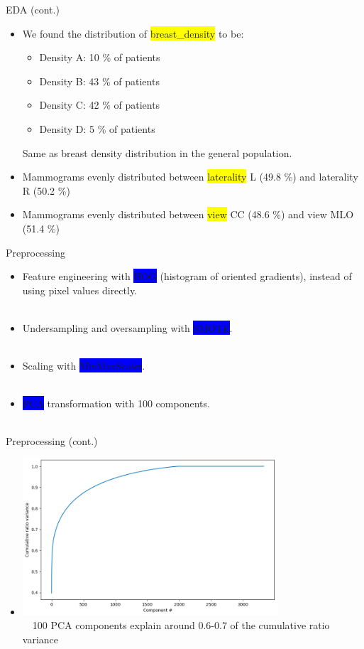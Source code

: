 \documentclass[14pt]{beamer}
\begin{document}
\begin{frame}{\small EDA (cont.)}
\begin{itemize}
    \item We found the distribution of \colorbox{yellow}{breast\_density} to be:
    \begin{itemize}
        \item Density A: 10 \% of patients
        \item Density B: 43 \% of patients
        \item Density C: 42 \% of patients
        \item Density D: 5 \% of patients
    \end{itemize}
    Same as breast density distribution in the general population.
    \item Mammograms evenly distributed between \colorbox{yellow}{laterality} L (49.8 \%) and laterality R (50.2 \%)
    \item Mammograms evenly distributed between \colorbox{yellow}{view} CC (48.6 \%) and view MLO (51.4 \%)
\end{itemize}
\end{frame}

\begin{frame}{\small Preprocessing}
\begin{itemize}
    \item Feature engineering with \colorbox{blue}{HOG} (histogram of oriented gradients), instead of using pixel values directly.\\~\
    
    \item Undersampling and oversampling with \colorbox{blue}{SMOTE}.\\~\
    
    \item Scaling with \colorbox{blue}{MinMaxScaler}.\\~\
    
    \item \colorbox{blue}{PCA} transformation with 100 components.\\~\
\end{itemize}
\end{frame}

\begin{frame}{\small Preprocessing (cont.)}
\begin{itemize}
    \item \includegraphics[width=0.75\textwidth]{PCA}\\~\
    100 PCA components explain around 0.6-0.7 of the cumulative ratio variance
\end{itemize}
\end{frame}
\end{document}
